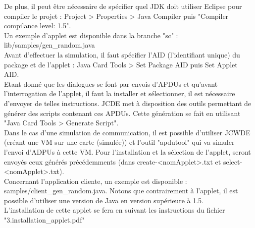 \documentclass[a4paper,11pt,french]{article}
\begin{document}
De plus, il peut être nécessaire de spécifier quel JDK doit utiliser Eclipse
pour compiler le projet : Project > Properties > Java Compiler puis "Compiler
compilance level: 1.5".\\

Un exemple d'applet est disponible dans la branche "sc" : lib/samples/gen\_random.java\\

Avant d'effectuer la simulation, il faut spécifier l'AID (l'identifiant
unique) du package et de l'applet : Java Card Tools > Set Package AID 
puis Set Applet AID.\\


Etant donné que les dialogues se font par envois d'APDUs et qu'avant
l'interrogation de l'applet, il faut la installer et sélectionner, il est
nécessaire d'envoyer de telles instructions. JCDE met à disposition des outils
permettant de générer des scripts contenant ces APDUs. Cette génération se
fait en utilisant "Java Card Tools > Generate Script".\\

Dans le cas d'une simulation de communication, il est possible d'utiliser
JCWDE (créant une VM sur une carte (simulée)) et l'outil "apdutool" qui va simuler
l'envoi d'ADPUs à cette VM. Pour l'installation et la sélection de l'applet,
seront envoyés ceux générés précédemments (dans create-<nomApplet>.txt et
select-<nomApplet>.txt).\\


Concernant l'application cliente, un exemple est disponible :
samples/client\_gen\_random.java. Notons que contrairement à l'applet, il est
possible d'utiliser une version de Java en version supérieure à 1.5.\\

L'installation de cette applet se fera en suivant les instructions du fichier
"3.installation\_applet.pdf"\\
\end{document}
